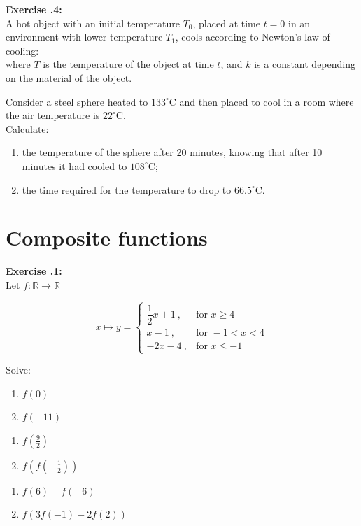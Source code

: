 \documentclass{article}
\newcommand{\exercise}[2][]{%
  \par\noindent\textbf{Exercise \thesection.#1:\\} #2\par \vspace*{.25cm}
}
\begin{document}
\exercise[4]{
  A hot object with an initial temperature $T_0$, placed at time $t=0$ in an environment with lower temperature $T_1$, cools according to Newton's law of cooling:
  \figbox{$T=T_1 + \left(T_0 - T_1\right) e^{-kt}$}\\
  where $T$ is the temperature of the object at time $t$, and $k$ is a constant depending on the material of the object.

  Consider a steel sphere heated to $133^\circ$C and then placed to cool in a room where the air temperature is $22^\circ$C.\\
  Calculate:
  \begin{enumerate}[label=\alph*.]
    \item the temperature of the sphere after 20 minutes, knowing that after 10 minutes it had cooled to $108^\circ$C;
    \item the time required for the temperature to drop to $66.5^\circ$C.
  \end{enumerate}
}

\section{Composite functions}
\exercise[1]{
  Let $f: \mathbb{R} \to \mathbb{R}$

  \[x \mapsto y =
    \begin{cases}
      \dfrac{1}{2}x+1\ , &\text{for } x \geq 4\\
      x-1\ , &\text{for } -1 < x < 4\\
      -2x-4\ , &\text{for } x\leq -1
    \end{cases}
  \]

  Solve:
  \noindent
  \begin{minipage}[t]{0.3\textwidth}
    \begin{enumerate}[label=\alph*.,itemsep=1em]
      \item $f(0)$
      \item $f(-11)$
    \end{enumerate}
  \end{minipage}%
  \hfill
  \begin{minipage}[t]{0.3\textwidth}
    \begin{enumerate}[label=\alph*.,resume,itemsep=1em]
      \item $f\!\left(\tfrac{9}{2}\right)$
      \item $f\!\left(f\!\left(-\tfrac{1}{2}\right)\right)$
    \end{enumerate}
  \end{minipage}%
  \hfill
  \begin{minipage}[t]{0.3\textwidth}
    \begin{enumerate}[label=\alph*.,resume,itemsep=1em]
      \item $f(6)-f(-6)$
      \item $f\!\left(3f(-1)-2f(2)\right)$
    \end{enumerate}
  \end{minipage}
}
\end{document}
